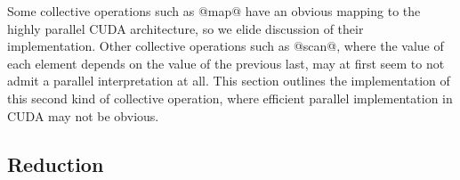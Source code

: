 
Some collective operations such as @map@ have an obvious mapping to the
highly parallel CUDA architecture, so we elide discussion of their
implementation. Other collective operations such as @scan@, where the value
of each element depends on the value of the previous last, may at first seem to
not admit a parallel interpretation at all. This section outlines the
implementation of this second kind of collective operation, where efficient
parallel implementation in CUDA may not be obvious.


\subsection{Reduction}
\label{sec:parallel_reduction}

